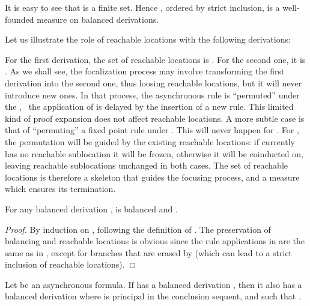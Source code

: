 It is easy to see that  is a finite set.
Hence , ordered by strict inclusion, is a well-founded measure
on balanced derivations.

Let us illustrate the role of reachable locations with the following
derivations:

For the first derivation, the set of reachable locations is
.
For the second one, it is .
As we shall see, the focalization process may involve transforming
the first derivation into the second one, thus loosing reachable locations,
but it will never introduce new ones.
In that process, the asynchronous rule  is ``permuted'' under
the , \ie\ the application of  is delayed by the insertion
of a new  rule.
This limited kind of proof expansion does not affect reachable locations.
A more subtle case is that of ``permuting'' a fixed point rule under .
This will never happen for . For , the permutation
will be guided by the existing reachable locations:
if  currently has no reachable sublocation it will be frozen,
otherwise it will be coinducted on,
leaving reachable sublocations unchanged in both cases.
The set of reachable locations is therefore
a skeleton that guides the focusing process,
and a measure which ensures its termination.

\begin{lemma} \label{lem:inst}
For any balanced derivation ,
 is balanced and .
\end{lemma}

\begin{proof}
By induction on , following the definition of .
The preservation of balancing and reachable locations is obvious since
the rule applications in  are the same as in ,
except for branches that are erased by 
(which can lead to a strict inclusion of reachable locations).
\end{proof}

\begin{lemma} \label{lem:async}
Let  be an asynchronous formula.
If  has a balanced derivation ,
then it also has a balanced derivation  where  is principal in the
conclusion sequent, and such that .
\end{lemma}

